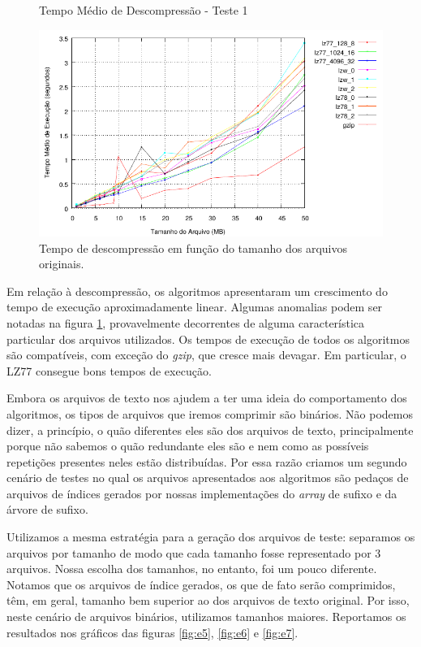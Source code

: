 \documentclass[]{article}
\newcommand{\figref}[1]{figura \ref{#1}}
\begin{document}
\begin{figure}
	{\centering Tempo Médio de Descompressão - Teste 1\par}
	\includegraphics{images/natural_descompressao}
\caption{Tempo de descompressão em função do tamanho dos arquivos originais.}
\label{fig:e4}
\end{figure}

Em relação à descompressão, os algoritmos apresentaram um crescimento do tempo de execução aproximadamente linear. Algumas anomalias podem ser notadas na \figref{fig:e4}, provavelmente decorrentes de alguma característica particular dos arquivos utilizados. Os tempos de execução de todos os algoritmos são compatíveis, com exceção do \textit{gzip}, que cresce mais devagar. Em particular, o LZ77 consegue bons tempos de execução.

Embora os arquivos de texto nos ajudem a ter uma ideia do comportamento dos algoritmos, os tipos de arquivos que iremos comprimir são binários. Não podemos dizer, a princípio, o quão diferentes eles são dos arquivos de texto, principalmente porque não sabemos o quão redundante eles são e nem como as possíveis repetições presentes neles estão distribuídas. Por essa razão criamos um segundo cenário de testes no qual os arquivos apresentados aos algoritmos são pedaços de arquivos de índices gerados por nossas implementações do \textit{array} de sufixo e da árvore de sufixo. 

Utilizamos a mesma estratégia para a geração dos arquivos de teste: separamos os arquivos por tamanho de modo que cada tamanho fosse representado por 3 arquivos. Nossa escolha dos tamanhos, no entanto, foi um pouco diferente. Notamos que os arquivos de índice gerados, os que de fato serão comprimidos, têm, em geral, tamanho bem superior ao dos arquivos de texto original. Por isso, neste cenário de arquivos binários, utilizamos tamanhos maiores. Reportamos os resultados nos gráficos das figuras \ref{fig:e5}, \ref{fig:e6} e \ref{fig:e7}.
\end{document}
